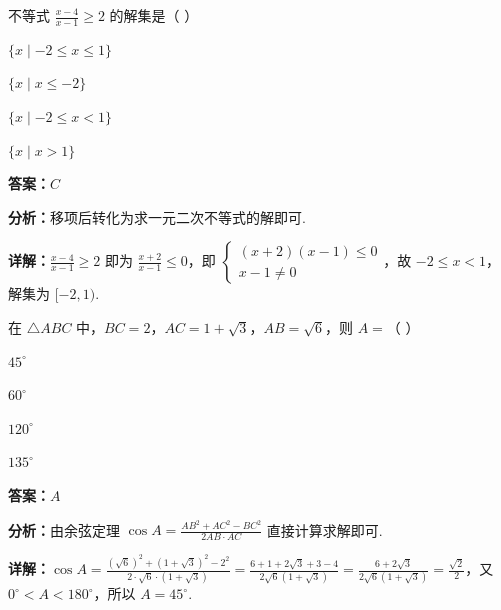 \begin{question}[points=5]
不等式 $\frac{x-4}{x-1}\ge 2$ 的解集是（ ）
\begin{choices}
  \item $\{x\mid -2\le x\le 1\}$
  \item $\{x\mid x\le -2\}$
  \item $\{x\mid -2\le x<1\}$
  \item $\{x\mid x>1\}$
\end{choices}
\begin{solution}
\textbf{答案：}$C$

\textbf{分析：}移项后转化为求一元二次不等式的解即可.

\textbf{详解：}$\frac{x-4}{x-1}\ge 2$ 即为 $\frac{x+2}{x-1}\le 0$，即 $\begin{cases}(x+2)(x-1)\le 0\\x-1\neq 0\end{cases}$，故 $-2\le x<1$，解集为 $[-2,1)$.
\end{solution}
\end{question}

\begin{question}[points=5]
在 $\triangle ABC$ 中，$BC=2$，$AC=1+\sqrt{3}$，$AB=\sqrt{6}$，则 $A=$（ ）
\begin{choices}
  \item $45^\circ$
  \item $60^\circ$
  \item $120^\circ$
  \item $135^\circ$
\end{choices}
\begin{solution}
\textbf{答案：}$A$

\textbf{分析：}由余弦定理 $\cos A=\frac{AB^2+AC^2-BC^2}{2AB\cdot AC}$ 直接计算求解即可.

\textbf{详解：}$\cos A=\frac{(\sqrt{6})^2+(1+\sqrt{3})^2-2^2}{2\cdot\sqrt{6}\cdot(1+\sqrt{3})}=\frac{6+1+2\sqrt{3}+3-4}{2\sqrt{6}(1+\sqrt{3})}=\frac{6+2\sqrt{3}}{2\sqrt{6}(1+\sqrt{3})}=\frac{\sqrt{2}}{2}$，又 $0^\circ<A<180^\circ$，所以 $A=45^\circ$.
\end{solution}
\end{question}

